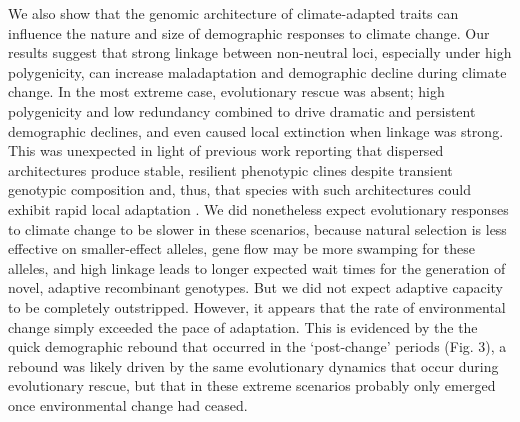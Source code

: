 \documentclass[9pt,twocolumn,twoside,lineno]{new_article}
\begin{document}
We also show that the genomic architecture of climate-adapted traits
can influence the nature and size of demographic responses
to climate change.
Our results suggest that strong linkage between non-neutral loci,
especially under high polygenicity, can increase maladaptation and demographic decline
during climate change. 
In the most extreme case, evolutionary rescue was absent;
high polygenicity and low redundancy
combined to drive dramatic and persistent demographic declines,
and even caused local extinction when linkage was strong.
This was unexpected in light of previous work reporting
that dispersed architectures produce stable,
resilient phenotypic clines despite transient genotypic composition \cite{yeaman_amnat,yeaman_review}
and, thus, that species with such architectures
could exhibit rapid local adaptation \cite{aitken_yeaman}.
We did nonetheless expect evolutionary responses to climate change
to be slower in these scenarios,
because natural selection is less effective on smaller-effect alleles,
gene flow may be more swamping for these alleles,
and high linkage leads to longer expected wait times for the generation
of novel, adaptive recombinant genotypes.
But we did not expect
adaptive capacity to be completely outstripped.
However, it appears that the rate of environmental change simply exceeded the pace of
adaptation. This is evidenced by the the quick demographic rebound
that occurred in the  
`post-change' periods (Fig. 3), a rebound was likely driven by the same evolutionary dynamics
that occur during evolutionary rescue, but that in these extreme scenarios
probably only emerged once environmental change had ceased.
\end{document}

